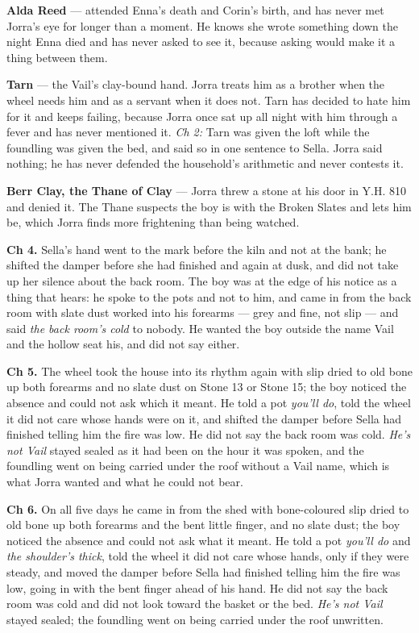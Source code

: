 \documentclass{design/chronicle}
\begin{document}
{\textbf{Alda Reed} — attended Enna’s death and Corin’s birth, and has never met Jorra’s eye for longer than a moment. He knows she wrote something down the night Enna died and has never asked to see it, because asking would make it a thing between them.

\textbf{Tarn} — the Vail’s clay-bound hand. Jorra treats him as a brother when the wheel needs him and as a servant when it does not. Tarn has decided to hate him for it and keeps failing, because Jorra once sat up all night with him through a fever and has never mentioned it. \emph{Ch 2:} Tarn was given the loft while the foundling was given the bed, and said so in one sentence to Sella. Jorra said nothing; he has never defended the household’s arithmetic and never contests it.

\textbf{Berr Clay, the Thane of Clay} — Jorra threw a stone at his door in Y.H. 810 and denied it. The Thane suspects the boy is with the Broken Slates and lets him be, which Jorra finds more frightening than being watched.

\textbf{Ch 4.} Sella’s hand went to the mark before the kiln and not at the bank; he shifted the damper before she had finished and again at dusk, and did not take up her silence about the back room. The boy was at the edge of his notice as a thing that hears: he spoke to the pots and not to him, and came in from the back room with slate dust worked into his forearms --- grey and fine, not slip --- and said \emph{the back room’s cold} to nobody. He wanted the boy outside the name Vail and the hollow seat his, and did not say either.

\textbf{Ch 5.} The wheel took the house into its rhythm again with slip dried to old bone up both forearms and no slate dust on Stone 13 or Stone 15; the boy noticed the absence and could not ask which it meant. He told a pot \emph{you’ll do}, told the wheel it did not care whose hands were on it, and shifted the damper before Sella had finished telling him the fire was low. He did not say the back room was cold. \emph{He’s not Vail} stayed sealed as it had been on the hour it was spoken, and the foundling went on being carried under the roof without a Vail name, which is what Jorra wanted and what he could not bear.

\textbf{Ch 6.} On all five days he came in from the shed with bone-coloured slip dried to old bone up both forearms and the bent little finger, and no slate dust; the boy noticed the absence and could not ask what it meant. He told a pot \emph{you’ll do} and \emph{the shoulder’s thick}, told the wheel it did not care whose hands, only if they were steady, and moved the damper before Sella had finished telling him the fire was low, going in with the bent finger ahead of his hand. He did not say the back room was cold and did not look toward the basket or the bed. \emph{He’s not Vail} stayed sealed; the foundling went on being carried under the roof unwritten.

}
\end{document}
